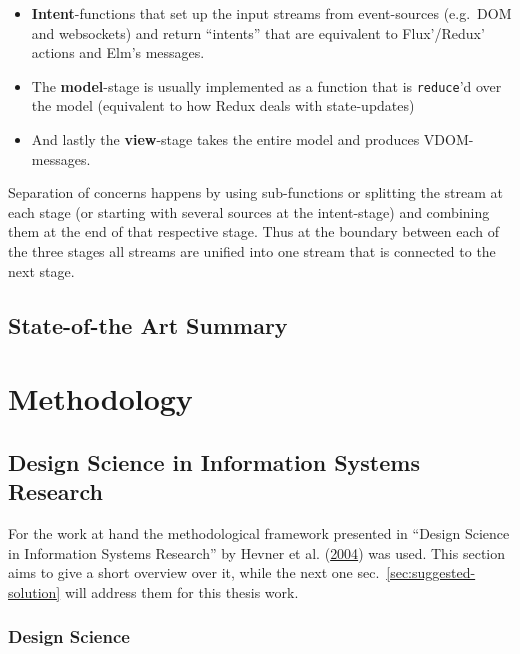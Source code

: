 \documentclass[a4paper,,tablecaptionabove]{scrbook}
\newcommand{\passthrough}[1]{#1}
\providecommand{\tightlist}{%
  \setlength{\itemsep}{0pt}\setlength{\parskip}{0pt}}
\begin{document}
\begin{itemize}
\tightlist
\item
  \textbf{Intent}-functions that set up the input streams from
  event-sources (e.g.~DOM and websockets) and return \enquote{intents}
  that are equivalent to Flux'/Redux' actions and Elm's messages.
\item
  The \textbf{model}-stage is usually implemented as a function that is
  \passthrough{\lstinline!reduce!}'d over the model (equivalent to how
  Redux deals with state-updates)
\item
  And lastly the \textbf{view}-stage takes the entire model and produces
  VDOM-messages.
\end{itemize}

Separation of concerns happens by using sub-functions or splitting the
stream at each stage (or starting with several sources at the
intent-stage) and combining them at the end of that respective stage.
Thus at the boundary between each of the three stages all streams are
unified into one stream that is connected to the next stage.

\hypertarget{state-of-the-art-summary}{%
\section{State-of-the Art Summary}\label{state-of-the-art-summary}}

\hypertarget{sec:methodology}{%
\chapter{Methodology}\label{sec:methodology}}

\hypertarget{design-science-in-information-systems-research}{%
\section{Design Science in Information Systems
Research}\label{design-science-in-information-systems-research}}

For the work at hand the methodological framework presented in
\enquote{Design Science in Information Systems Research} by Hevner et
al. (\protect\hyperlink{ref-HevnerDesignScienceInformation2004}{2004})
was used. This section aims to give a short overview over it, while the
next one sec.~\ref{sec:suggested-solution} will address them for this
thesis work.

\hypertarget{design-science}{%
\subsection{Design Science}\label{design-science}}
\end{document}
